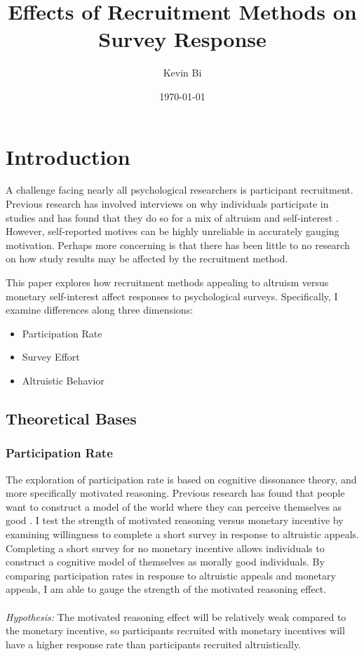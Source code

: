 \documentclass[12pt]{article}
\title{Effects of Recruitment Methods on Survey Response}
\author{Kevin Bi}
\date{\today}
\begin{document}
\maketitle

\section{Introduction}
A challenge facing nearly all psychological researchers is participant recruitment. Previous research has involved interviews on why individuals participate in studies and has found that they do so for a mix of altruism and self-interest \citep{mattson}. However, self-reported motives can be highly unreliable in accurately gauging motivation. Perhaps more concerning is that there has been little to no research on how study results may be affected by the recruitment method. 

This paper explores how recruitment methods appealing to altruism versus monetary self-interest affect responses to psychological surveys. Specifically, I examine differences along three dimensions: 
\begin{itemize}
    \item Participation Rate
    \item Survey Effort
    \item Altruistic Behavior
\end{itemize}

\subsection{Theoretical Bases}
\subsubsection{Participation Rate}
The exploration of participation rate is based on cognitive dissonance theory, and more specifically motivated reasoning. Previous research has found that people want to construct a model of the world where they can perceive themselves as good \citep{batson}. I test the strength of motivated reasoning versus monetary incentive by examining willingness to complete a short survey in response to altruistic appeals. Completing a short survey for no monetary incentive allows individuals to construct a cognitive model of themselves as morally good individuals. By comparing participation rates in response to altruistic appeals and monetary appeals, I am able to gauge the strength of the motivated reasoning effect. \\ \\
\emph{Hypothesis: } The motivated reasoning effect will be relatively weak compared to the monetary incentive, so participants recruited with monetary incentives will have a higher response rate than participants recruited altruistically. 
\end{document}
